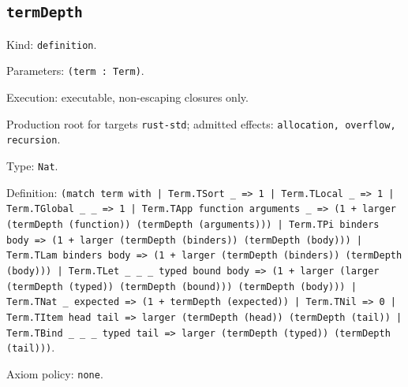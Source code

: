 \documentclass[11pt]{article}
\begin{document}
\subsection*{\texttt{termDepth}}
\noindent Kind: \texttt{definition}.\par
\noindent Parameters: \texttt{(term : Term)}.\par
\noindent Execution: executable, non-escaping closures only.\par
\noindent Production root for targets \texttt{rust-std}; admitted effects: \texttt{allocation, overflow, recursion}.\par
\noindent Type: \texttt{Nat}.\par
\noindent Definition: \texttt{(match term with | Term.TSort \_ => 1 | Term.TLocal \_ => 1 | Term.TGlobal \_ \_ => 1 | Term.TApp function arguments \_ => (1 + larger (termDepth (function)) (termDepth (arguments))) | Term.TPi binders body => (1 + larger (termDepth (binders)) (termDepth (body))) | Term.TLam binders body => (1 + larger (termDepth (binders)) (termDepth (body))) | Term.TLet \_ \_ \_ typed bound body => (1 + larger (larger (termDepth (typed)) (termDepth (bound))) (termDepth (body))) | Term.TNat \_ expected => (1 + termDepth (expected)) | Term.TNil => 0 | Term.TItem head tail => larger (termDepth (head)) (termDepth (tail)) | Term.TBind \_ \_ \_ typed tail => larger (termDepth (typed)) (termDepth (tail)))}.\par
\noindent Axiom policy: \texttt{none}.\par
\end{document}
